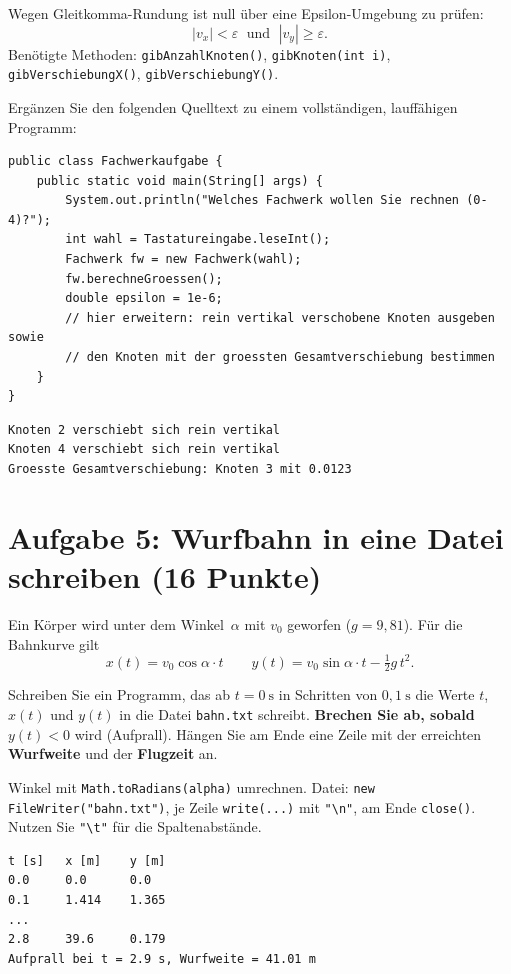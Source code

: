 \documentclass[
	fontsize=12pt,
	paper=a4,
	numbers=noenddot,
	parskip=half,
	openany
]{scrbook}
\begin{document}
\begin{hinweis}
	Wegen Gleitkomma-Rundung ist \glqq null\grqq{} über eine Epsilon-Umgebung zu prüfen:
	\[ |v_x| < \varepsilon \;\text{ und }\; |v_y| \ge \varepsilon. \]
	Benötigte Methoden: \texttt{gibAnzahlKnoten()}, \texttt{gibKnoten(int i)},\\ \texttt{gibVerschiebungX()}, \texttt{gibVerschiebungY()}.
\end{hinweis}

Ergänzen Sie den folgenden Quelltext zu einem vollständigen, lauffähigen Programm:

\begin{lstlisting}
public class Fachwerkaufgabe {
    public static void main(String[] args) {
        System.out.println("Welches Fachwerk wollen Sie rechnen (0-4)?");
        int wahl = Tastatureingabe.leseInt();
        Fachwerk fw = new Fachwerk(wahl);
        fw.berechneGroessen();
        double epsilon = 1e-6;
        // hier erweitern: rein vertikal verschobene Knoten ausgeben sowie
        // den Knoten mit der groessten Gesamtverschiebung bestimmen
    }
}
\end{lstlisting}

\begin{beispiel}
\begin{lstlisting}[language={}]
Knoten 2 verschiebt sich rein vertikal
Knoten 4 verschiebt sich rein vertikal
Groesste Gesamtverschiebung: Knoten 3 mit 0.0123
\end{lstlisting}
\end{beispiel}

\clearpage
\section*{Aufgabe 5: Wurfbahn in eine Datei schreiben \hfill (16 Punkte)}

Ein Körper wird unter dem Winkel~$\alpha$ mit $v_0$ geworfen ($g = 9{,}81$). Für die Bahnkurve gilt
\[ x(t) = v_0 \cos\alpha \cdot t \qquad y(t) = v_0 \sin\alpha \cdot t - \tfrac{1}{2} g\,t^2. \]

Schreiben Sie ein Programm, das ab $t = 0~\text{s}$ in Schritten von $0{,}1~\text{s}$ die Werte $t$, $x(t)$ und $y(t)$ in die Datei \texttt{bahn.txt} schreibt. \textbf{Brechen Sie ab, sobald $y(t) < 0$} wird (Aufprall).
Hängen Sie am Ende eine Zeile mit der erreichten \textbf{Wurfweite} und der \textbf{Flugzeit} an.

\begin{hinweis}[Hinweise]
	Winkel mit \texttt{Math.toRadians(alpha)} umrechnen.
	Datei: \lstinline|new FileWriter("bahn.txt")|, je Zeile \texttt{write(...)} mit \lstinline|"\n"|, am Ende \texttt{close()}.
	Nutzen Sie \lstinline|"\t"| für die Spaltenabstände.
\end{hinweis}

\begin{beispiel}[Erwarteter Dateiinhalt (Auszug, $v_0=20$, $\alpha=45^\circ$)]
\begin{lstlisting}[language={}]
t [s]   x [m]    y [m]
0.0     0.0      0.0
0.1     1.414    1.365
...
2.8     39.6     0.179
Aufprall bei t = 2.9 s, Wurfweite = 41.01 m
\end{lstlisting}
\end{beispiel}
\end{document}
